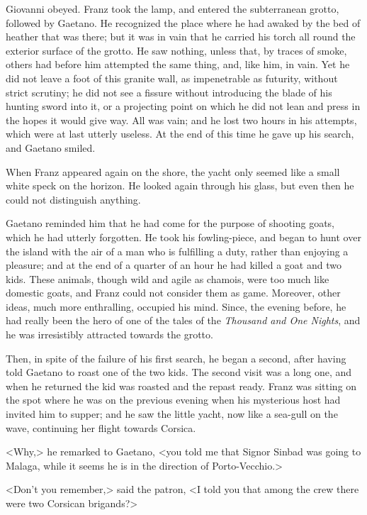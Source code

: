  Giovanni obeyed. Franz took the lamp, and entered the subterranean grotto, followed by Gaetano. He recognized the place where he had awaked by the bed of heather that was there; but it was in vain that he carried his torch all round the exterior surface of the grotto. He saw nothing, unless that, by traces of smoke, others had before him attempted the same thing, and, like him, in vain. Yet he did not leave a foot of this granite wall, as impenetrable as futurity, without strict scrutiny; he did not see a fissure without introducing the blade of his hunting sword into it, or a projecting point on which he did not lean and press in the hopes it would give way. All was vain; and he lost two hours in his attempts, which were at last utterly useless. At the end of this time he gave up his search, and Gaetano smiled. 

 When Franz appeared again on the shore, the yacht only seemed like a small white speck on the horizon. He looked again through his glass, but even then he could not distinguish anything. 

 Gaetano reminded him that he had come for the purpose of shooting goats, which he had utterly forgotten. He took his fowling-piece, and began to hunt over the island with the air of a man who is fulfilling a duty, rather than enjoying a pleasure; and at the end of a quarter of an hour he had killed a goat and two kids. These animals, though wild and agile as chamois, were too much like domestic goats, and Franz could not consider them as game. Moreover, other ideas, much more enthralling, occupied his mind. Since, the evening before, he had really been the hero of one of the tales of the \textit{Thousand and One Nights}, and he was irresistibly attracted towards the grotto. 

 Then, in spite of the failure of his first search, he began a second, after having told Gaetano to roast one of the two kids. The second visit was a long one, and when he returned the kid was roasted and the repast ready. Franz was sitting on the spot where he was on the previous evening when his mysterious host had invited him to supper; and he saw the little yacht, now like a sea-gull on the wave, continuing her flight towards Corsica. 

 <Why,> he remarked to Gaetano, <you told me that Signor Sinbad was going to Malaga, while it seems he is in the direction of Porto-Vecchio.> 

 <Don't you remember,> said the patron, <I told you that among the crew there were two Corsican brigands?> 

